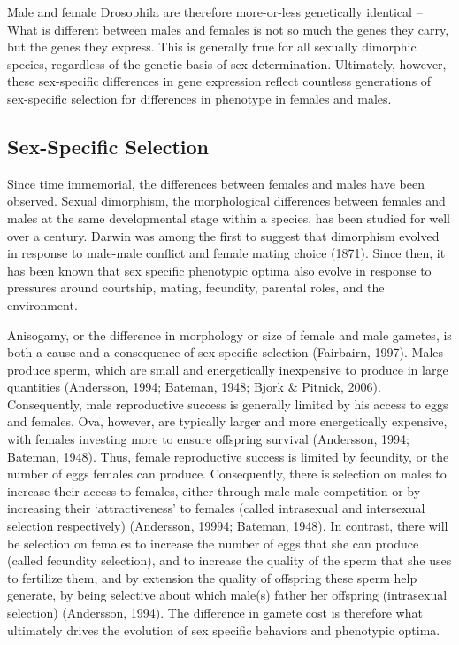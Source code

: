\documentclass[
  11pt,
]{article}
\begin{document}
\par

Male and female Drosophila are therefore more-or-less genetically
identical --What is different between males and females is not so much
the genes they carry, but the genes they express. This is generally true
for all sexually dimorphic species, regardless of the genetic basis of
sex determination. Ultimately, however, these sex-specific differences
in gene expression reflect countless generations of sex-specific
selection for differences in phenotype in females and males.

\subsection{Sex-Specific Selection}

\par

Since time immemorial, the differences between females and males have
been observed. Sexual dimorphism, the morphological differences between
females and males at the same developmental stage within a species, has
been studied for well over a century. Darwin was among the first to
suggest that dimorphism evolved in response to male-male conflict and
female mating choice (1871). Since then, it has been known that sex
specific phenotypic optima also evolve in response to pressures around
courtship, mating, fecundity, parental roles, and the environment.

\par

Anisogamy, or the difference in morphology or size of female and male
gametes, is both a cause and a consequence of sex specific selection
(Fairbairn, 1997). Males produce sperm, which are small and
energetically inexpensive to produce in large quantities (Andersson,
1994; Bateman, 1948; Bjork \& Pitnick, 2006). Consequently, male
reproductive success is generally limited by his access to eggs and
females. Ova, however, are typically larger and more energetically
expensive, with females investing more to ensure offspring survival
(Andersson, 1994; Bateman, 1948). Thus, female reproductive success is
limited by fecundity, or the number of eggs females can produce.
Consequently, there is selection on males to increase their access to
females, either through male-male competition or by increasing their
`attractiveness' to females (called intrasexual and intersexual
selection respectively) (Andersson, 19994; Bateman, 1948). In contrast,
there will be selection on females to increase the number of eggs that
she can produce (called fecundity selection), and to increase the
quality of the sperm that she uses to fertilize them, and by extension
the quality of offspring these sperm help generate, by being selective
about which male(s) father her offspring (intrasexual selection)
(Andersson, 1994). The difference in gamete cost is therefore what
ultimately drives the evolution of sex specific behaviors and phenotypic
optima.
\end{document}
